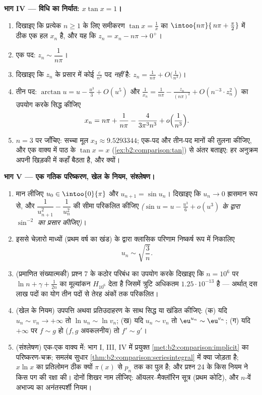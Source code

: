 \begin{problem}
\medskip
\noindent\textbf{भाग IV --- विधि का निर्यात: $x\tan x =
1$।}
\begin{enumerate}[resume]
  \item दिखाइए कि प्रत्येक $n \geq 1$ के लिए समीकरण $\tan x =
        \frac1x$ का $\intoo{n\pi}{\,n\pi + \frac\pi2}$ में ठीक एक हल
        $x_n$ है, और यह कि $z_n = x_n
        - n\pi \to 0^+$।
  \item एक पद: $z_n \sim \dfrac{1}{n\pi}$।
  \item दिखाइए कि $z_n$ के प्रसार में कोई $\frac{c}{n^2}$ पद \emph{नहीं} है: $z_n = \frac1{n\pi} +
        O\bigl(\frac{1}{n^3}\bigr)$।
  \item तीन पद: $\arctan u = u - \frac{u^3}3 +
        O(u^5)$ और $\frac1{x_n} = \frac{1}{n\pi} -
        \frac{z_n}{(n\pi)^2} + O(n^{-3}\cdot z_n^2)$ का उपयोग करके सिद्ध कीजिए
        \[
        x_n = n\pi + \frac{1}{n\pi} -
        \frac{4}{3\pi^3 n^3} + o\Bigl(\frac{1}{n^3}\Bigr).
        \]
  \item $n = 3$ पर जाँचिए: सच्चा मूल $x_3 \approx 9.5293344$; एक-पद और तीन-पद मानों की तुलना
        कीजिए, और एक वाक्य में पाठ के $\tan x = x$ (\cref{ex:b2:comparison:tan}) से अंतर बताइए: हर
        अनुक्रम अपनी खिड़की में कहाँ बैठता है, और क्यों।
\end{enumerate}

\medskip
\noindent\textbf{भाग V --- एक गतिक परिष्करण, खेल के नियम, संश्लेषण।}
\begin{enumerate}[resume]
  \item मान लीजिए $u_0 \in \intoo{0}{\pi}$ और $u_{n+1} = \sin u_n$। दिखाइए कि $u_n \to 0$ ह्रासमान रूप से, और $\dfrac{1}{u_{n+1}^2} - \dfrac{1}{u_n^2}$ की
        सीमा परिकलित कीजिए \emph{($\sin u = u - \frac{u^3}6 + o(u^3)$ के द्वारा $\sin^{-2}$ का प्रसार कीजिए)}।
  \item इससे चेज़ारो माध्यों (प्रथम वर्ष का खंड) के द्वारा क्लासिक
        परिणाम निष्कर्ष रूप में निकालिए
        \[
        u_n \sim \sqrt{\frac{3}{n}} .
        \]
  \item (प्रमाणित संख्यात्मकी) प्रश्न 7 के कठोर परिबंध का उपयोग करके
        दिखाइए कि $n
        = 10^6$ पर $\ln n + \gamma + \frac1{2n}$ का मूल्यांकन $H_{10^6}$ देता है जिसमें त्रुटि
        अधिकतम $1.25\cdot10^{-13}$ है --- अर्थात् दस लाख पदों का योग तीन पदों से तेरह
        अंकों तक परिकलित।
  \item (खेल के नियम) उपपत्ति अथवा प्रतिउदाहरण के साथ सिद्ध या खंडित
        कीजिए: (क) यदि $u_n \sim v_n \to +\infty$ तो $\ln u_n \sim \ln v_n$; (ख) यदि $u_n \sim v_n$ तो $\eu^{u_n} \sim \eu^{v_n}$; (ग) यदि $+\infty$
        पर $f \sim g$ हो ($f, g$ अवकलनीय) तो $f' \sim g'$।
  \item (संश्लेषण) एक-एक वाक्य में: भाग I, III, IV में प्रयुक्त \cref{met:b2:comparison:implicit}
        का परिष्करण-चक्र; समलंब सुधार \cref{thm:b2:comparison:seriesintegral} में क्या जोड़ता है; $x\ln x$ का
        प्रतिलोमन ठीक क्यों $\pi(x)$ से $p_n$ तक का पुल है; और प्रश्न 24 के
        किस नियम ने किस पग की रक्षा की। दोनों शिखर नाम लीजिए:
        ऑयलर--मैक्लॉरिन सूत्र (प्रथम कोटि), और $n$-वें अभाज्य का
        अनंतस्पर्शी नियम।
\end{enumerate}
\end{problem}
